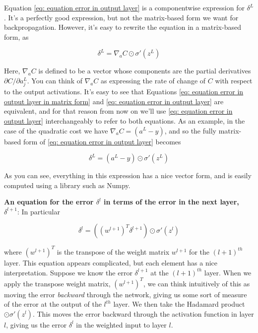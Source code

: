 Equation \ref{eq: equation error in output layer} is a componentwise expression for $\delta^L$. It's a perfectly good expression, but not the matrix-based form we want for backpropagation. However, it's easy to rewrite the equation in a matrix-based form, as

\begin{equation}
\delta^L=\nabla_a C \odot \sigma'(z^L)
\tag{BP1a}
\label{eq: equation error in output layer in matrix form}
\end{equation}

Here, $\nabla_a C$ is defined to be a vector whose components are the partial derivatives $\partial C/\partial a^L_{j}$. You can think of $\nabla_a C$ as expressing the rate of change of $C$ with respect to the output activations. It's easy to see that Equations \ref{eq: equation error in output layer in matrix form} and \ref{eq: equation error in output layer} are equivalent, and for that reason from now on we'll use \ref{eq: equation error in output layer} interchangeably to refer to both equations. As an example, in the case of the quadratic cost we have $\nabla_a C=(a^L-y)$, and so the fully matrix-based form of \ref{eq: equation error in output layer} becomes

\begin{equation}
\delta^L=(a^L-y) \odot \sigma'(z^L)
\label{eq: equation error in output layer in matrix form with der of cost}
\end{equation}

As you can see, everything in this expression has a nice vector form, and is easily computed using a library such as Numpy.

\textbf{An equation for the error $\delta^l$ in terms of the error in the next layer, $\delta^{l+1}$}: In particular

\begin{equation}
\delta^l=\left(\left(w^{l+1}\right)^T\delta^{l+1}\right)\odot\sigma'\left(z^l\right)
\tag{BP2}
\label{eq: equation error for l layer}
\end{equation}

where $(w^{l+1})^T$ is the transpose of the weight matrix $w^{l+1}$ for the $(l+1)^{th}$ layer. This equation appears complicated, but each element has a nice interpretation. Suppose we know the error $\delta^{l+1}$ at the $(l+1)^{th}$ layer. When we apply the transpose weight matrix, $(w^{l+1})^T$, we can think intuitively of this as moving the error \textit{backward} through the network, giving us some sort of measure of the error at the output of the $l^{th}$ layer. We then take the Hadamard product $\odot\sigma'(z^l)$. This moves the error backward through the activation function in layer $l$, giving us the error $\delta^l$ in the weighted input to layer $l$.

